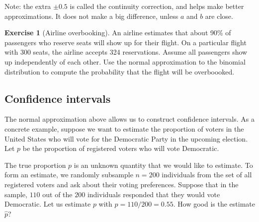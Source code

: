 \documentclass[11pt]{article}
\theoremstyle{definition}
\newtheorem{exercise}[]{Exercise}
\begin{document}
Note: the extra $\pm 0.5$ is called the continuity correction, and helps make better approximations.
It does not make a big difference, unless $a$ and $b$ are close.

\begin{exercise}[Airline overbooking]
  An airline estimates that about 90\% of passengers
  who reserve seats will show up for their flight.
   On a particular flight with 300 seats,
   the airline accepts 324 reservations.
   Assume all passengers show up independently of each other. Use the normal approximation to the binomial distribution
   to compute the probability that the flight will be
   overboooked.
\end{exercise}

\subsection{Confidence intervals}

The normal approximation above allows us to
construct confidence intervals. As a concrete example,
suppose we want to estimate the proportion of voters
in the United States
who will vote for the Democratic Party in the
upcoming election.
Let $p$ be the proportion of registered voters
who will vote Democratic.

The true proportion $p$ is an unknown quantity
that we would like to estimate. To form an estimate, we
randomly subsample $n = 200$ individuals
from the set of all registered voters and ask
about their voting preferences.
Suppose that in the sample, $110$ out of the $200$
individuals responded that they would vote
Democratic.
Let us estimate $p$ with $\hat p = 110/200 = 0.55$.
How good is the estimate $\hat p$?
\end{document}
